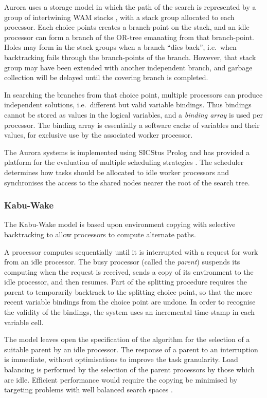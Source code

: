 Aurora uses a storage model in which the path of the search is represented
by a group of intertwining WAM stacks \cite{Tic91}, with a stack group allocated
to each processor.  Each choice points creates a branch-point on the stack, and
an idle processor can form a branch of the OR-tree emanating from that branch-point.
Holes may form in the stack groups when a branch ``dies back'', i.e.\ when
backtracking fails through the branch-points of the branch.  However, that 
stack group may have been extended with another independent branch, and garbage
collection will be delayed until the covering branch is completed.

In searching the branches from that choice point, multiple processors can
produce independent solutions, i.e.\ different but valid variable bindings.  Thus
bindings cannot be stored as values in the logical variables,  and a \textit{binding
array} is used per processor.  The binding array is essentially a software cache
of variables and their values, for exclusive use by the associated worker processor.

The Aurora systems is implemented using SICStus Prolog \cite{BBP+94} and has
provided a platform for the evaluation of multiple scheduling strategies
\cite{Bea91}.  The scheduler determines how tasks should be allocated to idle
worker processors and synchronises the access to the shared nodes nearer the
root of the search tree.

\subsubsection{Kabu-Wake}


The Kabu-Wake model \cite{MKI+86}
is based upon environment copying with selective backtracking
to allow processors to compute alternate paths.

A processor computes sequentially until it is interrupted with a request for
work from an idle processor.  The busy processor (called the \textit{parent}) suspends
its computing when the request is received, sends a copy of its environment to the
idle processor, and then resumes.  Part of the splitting procedure requires the
parent to temporarily backtrack to the splitting choice point, so that the more
recent variable bindings from the choice point are undone.  In order to recognise
the validity of the bindings, the system uses an incremental time-stamp in each
variable cell.

The model leaves open the
specification of the algorithm for the selection of a suitable parent
by an idle processor.
The response of a parent to an interruption is immediate, without
optimisations to improve the task granularity.
Load balancing is performed by the selection of the parent
processors by those which are idle.  Efficient performance would require the copying
be minimised by targeting problems with well balanced search spaces \cite{DR92}.

